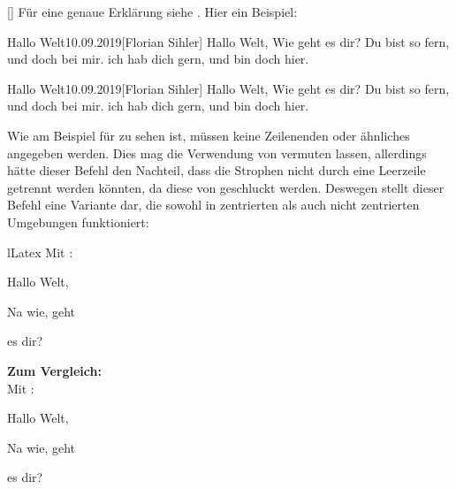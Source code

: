 %
%
%

[\secline{}]
Für eine genaue Erklärung siehe . Hier ein Beispiel:
\begin{latex}
\begin{poem*}{Hallo Welt}{10.09.2019}[Florian Sihler]
    Hallo Welt,
    Wie geht es dir?
    Du bist so fern,
    und doch bei mir.
    ich hab dich gern,
    und bin doch hier.
\end{poem*}
\end{latex}
\begin{poem*}{Hallo Welt}{10.09.2019}[Florian Sihler]
    Hallo Welt,
    Wie geht es dir?
    Du bist so fern,
    und doch bei mir.
    ich hab dich gern,
    und bin doch hier.
\end{poem*}

Wie am Beispiel für  zu sehen ist, müssen keine Zeilenenden oder ähnliches angegeben werden. Dies mag die Verwendung von  vermuten lassen, allerdings hätte dieser Befehl den Nachteil, dass die Strophen nicht durch eine Leerzeile getrennt werden könnten, da diese von  geschluckt werden. Deswegen stellt dieser Befehl eine Variante dar, die sowohl in zentrierten als auch nicht zentrierten Umgebungen funktioniert:
\begin{defaultlst}[][listing side text,righthand width=3.5cm]{lLatex}
Mit :
{
    \subduelines
    Hallo Welt,

    Na wie,
    geht

    es dir?
}

\textbf{Zum Vergleich: }\\
Mit :

{
    \obeylines
    Hallo Welt,

    Na wie,
    geht

    es dir?
}
\end{defaultlst}

%
%
%

